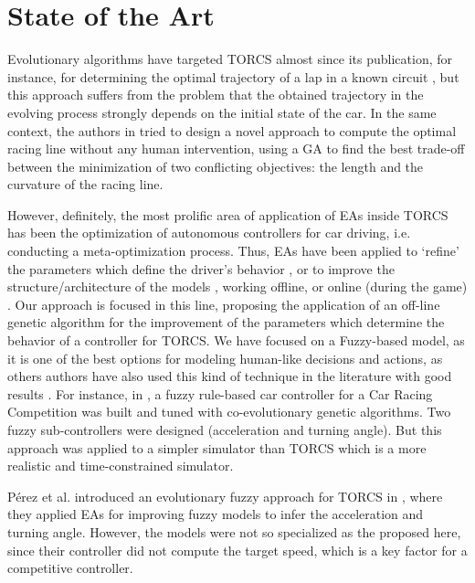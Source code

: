 \documentclass[sigconf]{acmart}
\begin{document}
\section{State of the Art}
\label{sec:soa}

Evolutionary algorithms have targeted TORCS almost since its
publication, for instance, for determining the
optimal trajectory of a lap in a known circuit \cite{drivingGA2008},
but this approach suffers from the problem that the obtained
trajectory in the evolving process strongly depends on the initial
state of the car.  
In the same context, the authors in \cite{GaRaceLine2010} tried to design a novel approach to compute the optimal racing line without any human intervention, using a GA to find the best trade-off between
the minimization of two conflicting objectives: the length and
the curvature of the racing line.

However, definitely, the most prolific area of application of EAs
inside TORCS has been the optimization of autonomous controllers for
car driving, i.e. conducting a meta-optimization process. 
Thus, EAs have been applied to `refine' the parameters which define
the driver's behavior \cite{ButzCMAES09,SAES2012}, or to improve the
structure/architecture of the models \cite{evol,neurone}, working
offline, or online (during the game)
\cite{TanOnline08,Cardamone_Online_NN}.
Our approach is focused in this line, proposing the application of an off-line genetic algorithm for the improvement of the parameters which determine the behavior of a controller for TORCS. We have focused on a Fuzzy-based model, as it is one of the best options for modeling human-like decisions and actions, as others authors have also used this kind of technique in the literature with good results \cite{torcs2012}. 
For instance, in \cite{Guadarrama2008}, a fuzzy rule-based car controller for a Car Racing Competition was built and tuned with co-evolutionary genetic algorithms. Two fuzzy sub-controllers were designed (acceleration and turning angle). %
But this approach was applied to a simpler simulator than TORCS which is a more realistic and time-constrained simulator. 

Pérez et al. introduced an evolutionary fuzzy approach for TORCS in \cite{PerezEvolvingFuzzy09}, where they applied EAs for improving fuzzy models to infer the acceleration and turning angle. However, the models were not so specialized as the proposed here, since their controller did not compute the target speed, which is a key factor for a competitive controller. 
\end{document}
